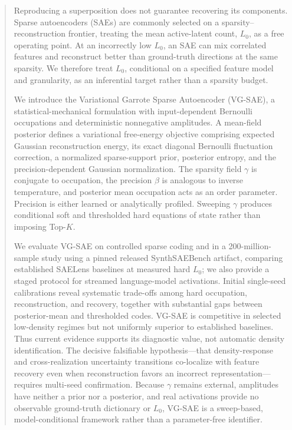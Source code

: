 \documentclass[aps,pre,reprint,superscriptaddress,amsmath,amssymb,nofootinbib]{revtex4-2}
\begin{document}
\begin{abstract}
Reproducing a superposition does not guarantee recovering its components.
Sparse autoencoders (SAEs) are commonly selected on a
sparsity--reconstruction frontier, treating the mean active-latent count,
$L_0$, as a free operating point.  At an incorrectly low $L_0$, an SAE can mix
correlated features and reconstruct better than ground-truth directions at the
same sparsity.  We therefore treat $L_0$, conditional on a specified feature
model and granularity, as an inferential target rather than a sparsity budget.

We introduce the Variational Garrote Sparse Autoencoder (VG-SAE), a
statistical-mechanical formulation with input-dependent Bernoulli occupations
and deterministic nonnegative amplitudes.  A mean-field posterior defines a
variational free-energy objective comprising expected Gaussian reconstruction
energy, its exact diagonal Bernoulli fluctuation correction, a normalized
sparse-support prior, posterior entropy, and the precision-dependent Gaussian
normalization.  The sparsity field $\gamma$ is conjugate to occupation, the
precision $\beta$ is analogous to inverse temperature, and posterior mean
occupation acts as an order parameter.  Precision is either learned or
analytically profiled.  Sweeping $\gamma$ produces conditional soft and
thresholded hard equations of state rather than imposing Top-$K$.

We evaluate VG-SAE on controlled sparse coding and in a 200-million-sample
study using a pinned released SynthSAEBench artifact, comparing established
SAELens baselines at measured hard $L_0$; we also provide a staged protocol for
streamed language-model activations.  Initial single-seed calibrations reveal
systematic trade-offs among hard occupation, reconstruction, and recovery,
together with substantial gaps between posterior-mean and thresholded codes.
VG-SAE is competitive in selected low-density regimes but not uniformly
superior to established baselines.  Thus current evidence supports its
diagnostic value, not automatic density identification.  The decisive
falsifiable hypothesis---that density-response and cross-realization
uncertainty transitions co-localize with feature recovery even when
reconstruction favors an incorrect representation---requires multi-seed
confirmation.  Because $\gamma$ remains external, amplitudes have neither a
prior nor a posterior, and real activations provide no observable ground-truth
dictionary or $L_0$, VG-SAE is a sweep-based, model-conditional framework
rather than a parameter-free identifier.
\end{abstract}
\end{document}
